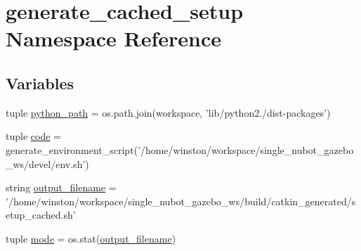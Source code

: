 \hypertarget{namespacegenerate__cached__setup}{\section{generate\-\_\-cached\-\_\-setup Namespace Reference}
\label{namespacegenerate__cached__setup}
}
\subsection*{Variables}
\begin{DoxyCompactItemize}
\item 
tuple \hyperlink{namespacegenerate__cached__setup_a770288702e38f06cf1b86a33bc07723e}{python\-\_\-path} = os.\-path.\-join(workspace, 'lib/python2./dist-\/packages')
\item 
tuple \hyperlink{namespacegenerate__cached__setup_a4ed71aac3acd6cda6640f912559b5408}{code} = generate\-\_\-environment\-\_\-script('/home/winston/workspace/single\-\_\-nubot\-\_\-gazebo\-\_\-ws/devel/env.\-sh')
\item 
string \hyperlink{namespacegenerate__cached__setup_a0265aee5075ee1eb701ff69c98ad6793}{output\-\_\-filename} = '/home/winston/workspace/single\-\_\-nubot\-\_\-gazebo\-\_\-ws/build/catkin\-\_\-generated/setup\-\_\-cached.\-sh'
\item 
tuple \hyperlink{namespacegenerate__cached__setup_afd1a431f16a2a78ef0438a658e4ac3cf}{mode} = os.\-stat(\hyperlink{namespacegenerate__cached__setup_a0265aee5075ee1eb701ff69c98ad6793}{output\-\_\-filename})
\end{DoxyCompactItemize}


